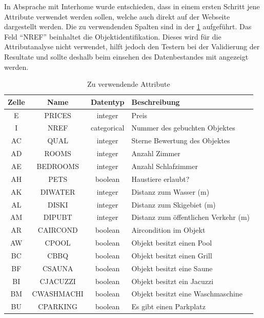 In Absprache mit Interhome wurde entschieden, dass in einem ersten Schritt jene Attribute verwendet werden sollen, welche auch direkt auf der Webseite dargestellt werden. Die zu verwendenden Spalten sind in der \cref{fig:recherche:attributeinschraenkung:2} aufgeführt. Das Feld "`NREF"' beinhaltet die Objektidentifikation. Dieses wird für die Attributanalyse nicht verwendet, hilft jedoch den Testern bei der Validierung der Resultate und sollte deshalb beim einsehen des Datenbestandes mit angezeigt werden.

\begin{table}[H] 
	\caption{Zu verwendende Attribute}
	\centering
	\label{fig:recherche:attributeinschraenkung:2}
	\begin{tabular}{ | c | c | c | l | } 
		\hline 
		\rowcolor{tableheadcolor}
		\bfseries Zelle & \bfseries Name & \bfseries Datentyp & \bfseries Beschreibung \\ \hline 
		E & PRICES & integer & Preis \\ \hline 
		I & NREF & categorical & Nummer des gebuchten Objektes \\ \hline 
		AC & QUAL & integer & Sterne Bewertung des Objektes \\ \hline 
		AD & ROOMS & integer & Anzahl Zimmer \\ \hline 
		AE & BEDROOMS & integer & Anzahl Schlafzimmer \\ \hline 
		AH & PETS & boolean & Haustiere erlaubt? \\ \hline 
		AK & DIWATER & integer & Distanz zum Wasser (m) \\ \hline 
		AL & DISKI & integer & Distanz zum Skigebiet (m) \\ \hline 
		AM & DIPUBT & integer & Distanz zum öffentlichen Verkehr (m) \\ \hline 
		AR & CAIRCOND & boolean & Aircondition im Objekt\\ \hline 
		AW & CPOOL & boolean & Objekt besitzt einen Pool \\ \hline 
		BC & CBBQ & boolean & Objekt besitzt einen Grill \\ \hline 
		BF & CSAUNA & boolean & Objekt besitzt eine Saune \\ \hline 
		BI & CJACUZZI & boolean & Objekt besitzt ein Jacuzzi \\ \hline 
		BM & CWASHMACHI & boolean & Objekt besitzt eine Waschmaschine \\ \hline 
		BU & CPARKING & boolean & Es gibt einen Parkplatz \\ \hline 

\end{tabular}
\end{table}
